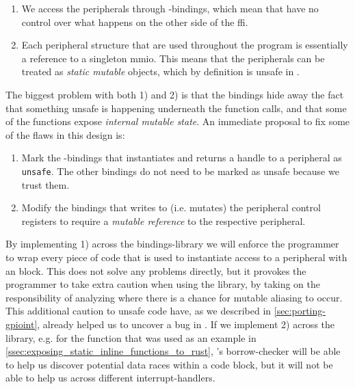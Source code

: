 \begin{enumerate}[\hspace{13}1)]
    \item We access the peripherals through {\C}-bindings, which mean that {\rust} have no control over what happens on the other side of the \gls{ffi}.

    \item Each peripheral structure that are used throughout the program is essentially a reference to a singleton \gls{mmio}.
    This means that the peripherals can be treated as \emph{static mutable} objects, which by definition is unsafe in {\rust}.

\end{enumerate}

The biggest problem with both 1) and 2) is that the bindings hide away the fact that something unsafe is happening underneath the function calls, and that some of the functions expose \emph{internal mutable state}.
An immediate proposal to fix some of the flaws in this design is:

\begin{enumerate}[\hspace{13}1)]
    \item Mark the {\rust}-bindings that instantiates and returns a handle to a peripheral as \texttt{unsafe}.
    The other bindings do not need to be marked as unsafe because we trust them.

    \item Modify the bindings that writes to (i.e. mutates) the peripheral control registers to require a \emph{mutable reference} to the respective peripheral.
\end{enumerate}

By implementing 1) across the bindings-library we will enforce the programmer to wrap every piece of code that is used to instantiate access to a peripheral with an  block.
This does not solve any problems directly, but it provokes the programmer to take extra caution when using the library, by taking on the responsibility of analyzing where there is a chance for mutable aliasing to occur.
This additional caution to unsafe code have, as we described in \autoref{sec:porting-gpioint}, already helped us to uncover a bug in .
If we implement 2) across the library, e.g. for the function that was used as an example in \autoref{ssec:exposing_static_inline_functions_to_rust}, {\rust}'s borrow-checker will be able to help us discover potential data races within a code block, but it will not be able to help us across different interrupt-handlers.


